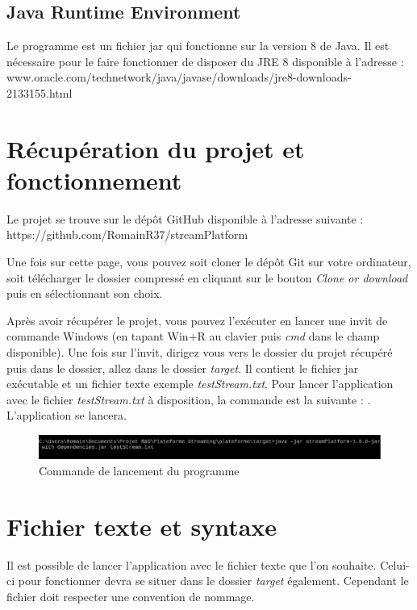 \documentclass{polytech/polytech}
\begin{document}
\subsection{Java Runtime Environment}

Le programme est un fichier jar qui fonctionne sur la version 8 de Java. Il est nécessaire pour le faire fonctionner de disposer du JRE 8 disponible à l'adresse : www.oracle.com/technetwork/java/javase/downloads/jre8-downloads-2133155.html


\section{Récupération du projet et fonctionnement}

Le projet se trouve sur le dépôt GitHub disponible à l'adresse suivante : https://github.com/RomainR37/streamPlatform

Une fois sur cette page, vous pouvez soit cloner le dépôt Git sur votre ordinateur, soit télécharger le dossier compressé en cliquant sur le bouton \textit{Clone or download} puis en sélectionnant son choix.

Après avoir récupérer le projet, vous pouvez l'exécuter en lancer une invit de commande Windows (en tapant Win+R au clavier puis \textit{cmd} dans le champ disponible). Une fois sur l'invit, dirigez vous vers le dossier du projet récupéré puis dans le dossier, allez dans le dossier \textit{target}. Il contient le fichier jar exécutable et un fichier texte exemple \textit{testStream.txt}. Pour lancer l'application avec le fichier \textit{testStream.txt} à disposition, la commande est la suivante : . L'application se lancera.

\begin{figure}
	\includegraphics[scale=0.6]{images/cmdLancement.png}
	\caption{Commande de lancement du programme}
\end{figure}


\section{Fichier texte et syntaxe}

Il est possible de lancer l'application avec le fichier texte que l'on souhaite. Celui-ci pour fonctionner devra se situer dans le dossier \textit{target} également. Cependant le fichier doit respecter une convention de nommage. 
\end{document}
